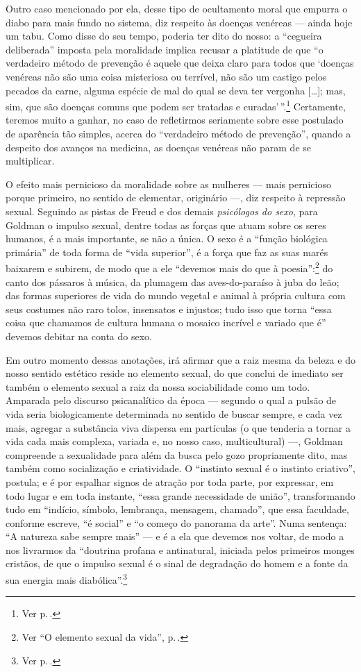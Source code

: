 Outro caso mencionado por ela, desse
tipo de ocultamento moral que empurra o diabo para mais fundo no
sistema, diz respeito às doenças venéreas --- ainda hoje um tabu. Como
disse do seu tempo, poderia ter dito do nosso: a ``cegueira deliberada''
imposta pela moralidade implica recusar a platitude de que ``o
verdadeiro método de prevenção é aquele que deixa claro para todos que
`doenças venéreas não são uma coisa misteriosa ou terrível, não são um
castigo pelos pecados da carne, alguma espécie de mal do qual se deva
ter vergonha {[}\ldots{]}; mas, sim, que são doenças comuns que podem ser
tratadas e curadas'\,''.\footnote{Ver p.\,\pageref{std}.} Certamente, teremos muito a ganhar, no caso de refletirmos seriamente sobre esse postulado de aparência tão simples,
acerca do ``verdadeiro método de prevenção'', quando a despeito dos
avanços na medicina, as doenças venéreas não param de se multiplicar.

O efeito mais pernicioso da moralidade sobre as mulheres --- mais
pernicioso porque primeiro, no sentido de elementar, originário ---, diz
respeito à repressão sexual. Seguindo as pistas de Freud e dos demais
\textit{psicólogos do sexo}, para Goldman o impulso sexual, dentre todas as forças que atuam
sobre os seres humanos, é a mais importante, se não a única.
O sexo é a ``função biológica primária'' de toda forma de ``vida superior'', é a
força que faz as suas marés baixarem e subirem, de modo que a ele
``devemos mais do que à poesia'':\footnote{Ver ``O elemento sexual da vida'', p.\,\pageref{sexual}.} do canto dos pássaros à música, da
plumagem das aves-do-paraíso à juba do leão; das formas superiores de
vida do mundo vegetal e animal à própria cultura com seus costumes não
raro tolos, insensatos e injustos; tudo isso que torna
``essa coisa que chamamos de cultura humana o mosaico incrível e variado
que é'' devemos debitar na conta do sexo.

Em outro momento dessas anotações, irá afirmar que a raiz mesma da beleza e do nosso
sentido estético reside no elemento sexual, do que conclui de imediato
ser também o elemento sexual a raiz da nossa sociabilidade como um todo.
Amparada pelo discurso psicanalítico da época --- segundo o qual a pulsão
de vida seria biologicamente determinada no sentido de buscar sempre, e
cada vez mais, agregar a substância viva dispersa em partículas (o que
tenderia a tornar a vida cada mais complexa, variada e, no nosso caso,
multicultural) ---, Goldman compreende a sexualidade para além da busca
pelo gozo propriamente dito, mas também como socialização e criatividade. O
``instinto sexual é o instinto criativo'', postula; e é por espalhar
signos de atração por toda parte, por expressar, em todo lugar e em
toda instante, ``essa grande necessidade de união'', transformando tudo
em ``indício, símbolo, lembrança, mensagem, chamado'', que essa
faculdade, conforme escreve, ``é social'' e ``o começo do panorama
da arte''. Numa sentença: ``A natureza sabe sempre mais'' --- e é a ela
que devemos nos voltar, de modo a nos livrarmos da ``doutrina profana e
antinatural, iniciada pelos primeiros monges cristãos, de que o impulso
sexual é o sinal de degradação do homem e a fonte da sua energia mais
diabólica''.\footnote{Ver p.\,\pageref{diabolica}.}

